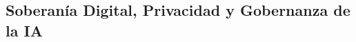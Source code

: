 \begin{refsection}
\chapter{Soberanía Digital, Privacidad y Gobernanza de la IA}
\label{chapter:chapter-6}


\begin{comment}
\begin{enumerate}
\item \textbf{Soberanía Digital, Privacidad y Gobernanza de la IA (Capítulo 6):}  
\begin{itemize}
    \item Contexto de riesgos de la vigilancia masiva, soberanía digital y gobernanza descentralizada.
    \item Herramientas como blockchain para proteger datos y derechos digitales.
    \item Dimensión de explicabilidad: Visualización de datos para facilitar la gobernanza participativa.
    \item Actividad: Desarrollar un sistema de gestión de identidad descentralizada con \texttt{Flask} y blockchain.
\end{itemize}
\end{enumerate}
\end{comment}





\nocite{*}


\printbibliography[heading=subbibliography, title={Bibliografía del Capítulo 6}]
\end{refsection}
